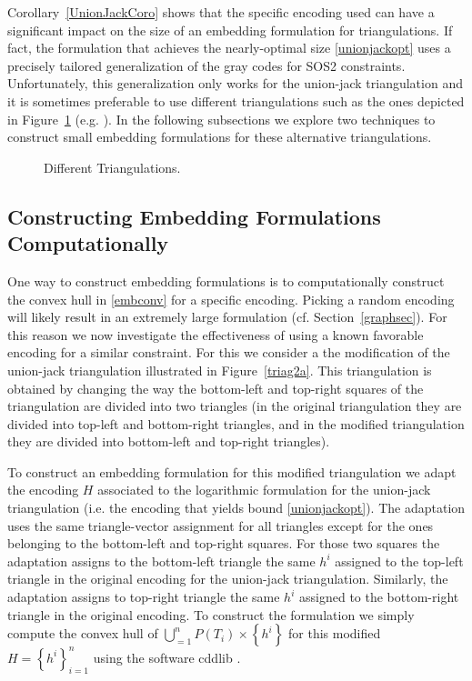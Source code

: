 \documentclass[mnsc]{informs3}
\newcommand{\set}[1]{\left\{#1\right\}}                     %
\newcommand{\bra}[1]{\left(#1\right)}
\begin{document}
 Corollary~\ref{UnionJackCoro} shows that the specific encoding used can have a significant impact on the size of an embedding formulation for triangulations. If fact, the formulation that achieves the nearly-optimal size \eqref{unionjackopt} uses a precisely tailored generalization of the gray codes for SOS2 constraints. Unfortunately, this generalization only works for the union-jack triangulation and it is sometimes preferable to use different triangulations such as the ones depicted in Figure~\ref{triag2} (e.g. \cite{Fitting-Piecewise-Linear}). In the following subsections we explore two techniques to construct small embedding formulations for these alternative triangulations.
\begin{figure}[htpb]
  \begin{center}
  \end{center}
  \caption{Different Triangulations.}\label{triag2}
  \end{figure}

\subsection{Constructing Embedding Formulations Computationally}\label{cddsec}

One way to construct embedding formulations is to computationally construct the convex hull in \eqref{embconv} for a specific encoding. Picking a random encoding will likely result in an extremely large formulation (cf. Section~\ref{graphsec}). For this reason we now investigate the effectiveness of using a known favorable encoding for a similar constraint. For this we consider a the modification of the union-jack triangulation illustrated in Figure~\ref{triag2a}. This triangulation is obtained by changing the way the bottom-left and top-right squares of the triangulation are divided into two triangles (in the original triangulation they are divided into top-left and bottom-right triangles, and in the modified triangulation they are divided into bottom-left and top-right triangles). 

To construct an embedding formulation for this modified triangulation we adapt the encoding $H$ associated to the logarithmic formulation for the union-jack triangulation (i.e. the encoding that yields bound \eqref{unionjackopt}). The adaptation uses the same triangle-vector assignment for all triangles except for the ones belonging to the bottom-left and top-right squares. For those two squares the adaptation assigns to the bottom-left triangle the same $h^i$ assigned to the top-left triangle in the original encoding for the union-jack triangulation. Similarly, the adaptation assigns to top-right triangle the same $h^i$ assigned to the bottom-right triangle in the original encoding. To construct the formulation we simply compute the convex hull of $\bigcup_{=1}^n P\bra{T_i} \times \set{h^i}$ for this modified $H=\set{h^i}_{i=1}^n$ using the software cddlib \citep{cddlib}. 
\end{document}

